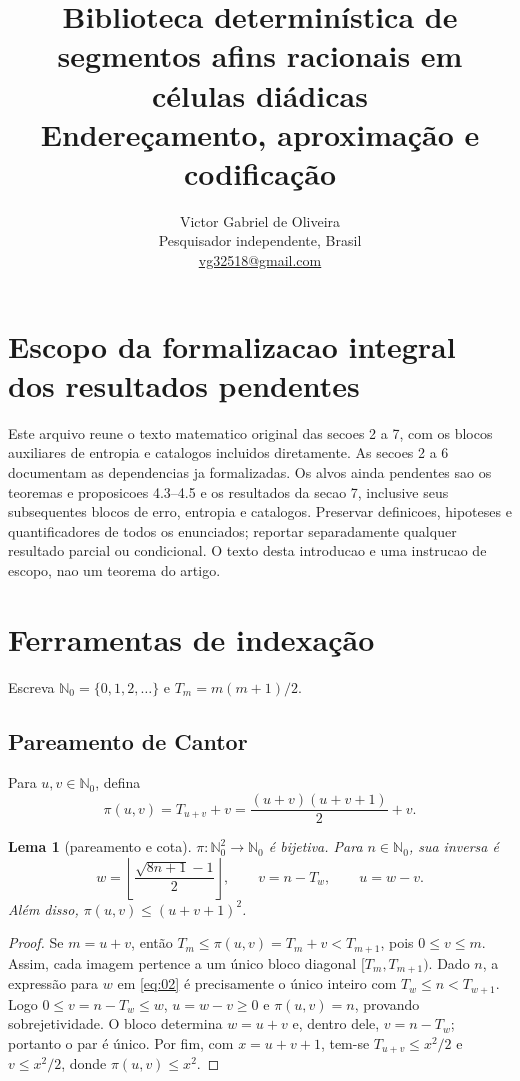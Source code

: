 \documentclass[11pt,a4paper]{article}
\title{\vspace{-18mm}\bfseries Biblioteca determinística de segmentos afins racionais em células diádicas\\[4pt]
 \large Endereçamento, aproximação e codificação}
\author{Victor Gabriel de Oliveira\\
 \small Pesquisador independente, Brasil\\[-1pt]
 \small\href{mailto:vg32518@gmail.com}{vg32518@gmail.com}}
\date{}
\theoremstyle{preciso}
\newtheorem{lema}[teorema]{Lema}
\theoremstyle{definition}
\newcommand{\N}{\mathbb N}
\newcommand{\eqn}[2]{\begin{equation}\label{eq:#1}#2\end{equation}}
\begin{document}
\maketitle
\thispagestyle{plain}
\section*{Escopo da formalizacao integral dos resultados pendentes}
Este arquivo reune o texto matematico original das secoes 2 a 7, com os blocos auxiliares de entropia e catalogos incluidos diretamente. As secoes 2 a 6 documentam as dependencias ja formalizadas. Os alvos ainda pendentes sao os teoremas e proposicoes 4.3--4.5 e os resultados da secao 7, inclusive seus subsequentes blocos de erro, entropia e catalogos. Preservar definicoes, hipoteses e quantificadores de todos os enunciados; reportar separadamente qualquer resultado parcial ou condicional. O texto desta introducao e uma instrucao de escopo, nao um teorema do artigo.
\setcounter{section}{1}

\section{Ferramentas de indexação}
Escreva $\N_0=\{0,1,2,\ldots\}$ e $T_m=m(m+1)/2$.

\subsection{Pareamento de Cantor}
Para $u,v\in\N_0$, defina
\eqn{01}{\pi(u,v)=T_{u+v}+v=\frac{(u+v)(u+v+1)}2+v.}
\begin{lema}[pareamento e cota]
$\pi:\N_0^2\to\N_0$ é bijetiva. Para $n\in\N_0$, sua inversa é
\eqn{02}{w=\left\lfloor\frac{\sqrt{8n+1}-1}{2}\right\rfloor,\qquad v=n-T_w,\qquad u=w-v.}
Além disso, $\pi(u,v)\le(u+v+1)^2$.
\end{lema}
\begin{proof}
Se $m=u+v$, então $T_m\le\pi(u,v)=T_m+v<T_{m+1}$, pois $0\le v\le m$. Assim, cada imagem pertence a um único bloco diagonal $[T_m,T_{m+1})$. Dado $n$, a expressão para $w$ em \eqref{eq:02} é precisamente o único inteiro com $T_w\le n<T_{w+1}$. Logo $0\le v=n-T_w\le w$, $u=w-v\ge0$ e $\pi(u,v)=n$, provando sobrejetividade. O bloco determina $w=u+v$ e, dentro dele, $v=n-T_w$; portanto o par é único. Por fim, com $x=u+v+1$, tem-se $T_{u+v}\le x^2/2$ e $v\le x^2/2$, donde $\pi(u,v)\le x^2$.
\end{proof}
\end{document}
